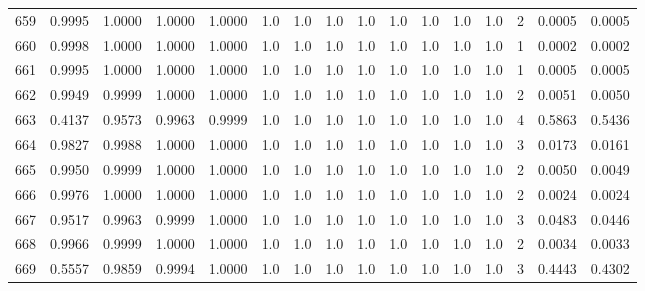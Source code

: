 \begin{tabular}{lrrrrrrrrrrrrrrr}
659 &      0.9995 &  1.0000 &  1.0000 &  1.0000 &     1.0 &     1.0 &     1.0 &     1.0 &     1.0 &     1.0 &      1.0 &        1.0 &      2 &                    0.0005 &                     0.0005 \\
660 &      0.9998 &  1.0000 &  1.0000 &  1.0000 &     1.0 &     1.0 &     1.0 &     1.0 &     1.0 &     1.0 &      1.0 &        1.0 &      1 &                    0.0002 &                     0.0002 \\
661 &      0.9995 &  1.0000 &  1.0000 &  1.0000 &     1.0 &     1.0 &     1.0 &     1.0 &     1.0 &     1.0 &      1.0 &        1.0 &      1 &                    0.0005 &                     0.0005 \\
662 &      0.9949 &  0.9999 &  1.0000 &  1.0000 &     1.0 &     1.0 &     1.0 &     1.0 &     1.0 &     1.0 &      1.0 &        1.0 &      2 &                    0.0051 &                     0.0050 \\
663 &      0.4137 &  0.9573 &  0.9963 &  0.9999 &     1.0 &     1.0 &     1.0 &     1.0 &     1.0 &     1.0 &      1.0 &        1.0 &      4 &                    0.5863 &                     0.5436 \\
664 &      0.9827 &  0.9988 &  1.0000 &  1.0000 &     1.0 &     1.0 &     1.0 &     1.0 &     1.0 &     1.0 &      1.0 &        1.0 &      3 &                    0.0173 &                     0.0161 \\
665 &      0.9950 &  0.9999 &  1.0000 &  1.0000 &     1.0 &     1.0 &     1.0 &     1.0 &     1.0 &     1.0 &      1.0 &        1.0 &      2 &                    0.0050 &                     0.0049 \\
666 &      0.9976 &  1.0000 &  1.0000 &  1.0000 &     1.0 &     1.0 &     1.0 &     1.0 &     1.0 &     1.0 &      1.0 &        1.0 &      2 &                    0.0024 &                     0.0024 \\
667 &      0.9517 &  0.9963 &  0.9999 &  1.0000 &     1.0 &     1.0 &     1.0 &     1.0 &     1.0 &     1.0 &      1.0 &        1.0 &      3 &                    0.0483 &                     0.0446 \\
668 &      0.9966 &  0.9999 &  1.0000 &  1.0000 &     1.0 &     1.0 &     1.0 &     1.0 &     1.0 &     1.0 &      1.0 &        1.0 &      2 &                    0.0034 &                     0.0033 \\
669 &      0.5557 &  0.9859 &  0.9994 &  1.0000 &     1.0 &     1.0 &     1.0 &     1.0 &     1.0 &     1.0 &      1.0 &        1.0 &      3 &                    0.4443 &                     0.4302 \\

\end{tabular}

